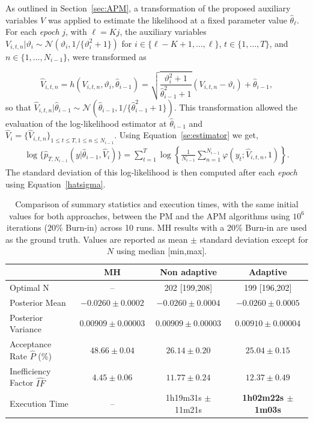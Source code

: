 \documentclass[pdflatex,sn-mathphys-num]{sn-jnl}
\renewcommand{\leq}{\leqslant}
\theoremstyle{thmstyleone}
\theoremstyle{thmstyletwo}
\theoremstyle{thmstylethree}
\begin{document}
As outlined in Section~\ref{sec:APM}, a transformation of the proposed auxiliary variables \( V \) was applied to estimate the likelihood at a fixed parameter value \( \hat{\theta}_\ell \). For each \textit{epoch} \( j \), with \( \ell = Kj \), the auxiliary variables \( V_{i,t,n}|\vartheta_i \sim \mathcal{N}(\vartheta_i, 1/\{\vartheta_i^2 + 1\}) \) for \( i \in \{\ell - K + 1, \ldots, \ell\} \), \( t \in \{1, \ldots, T\} \), and \( n \in \{1, \ldots, N_{i-1}\} \), were transformed as

\[
\widehat{V}_{i,t,n} = h(V_{i,t,n},\vartheta_i,\hat{\theta}_{i-1}) = \sqrt{\frac{\vartheta_i^2 + 1}{\hat{\theta}_{i-1}^2 + 1}}(V_{i,t,n} - \vartheta_i) + \hat{\theta}_{i-1},
\]
so that \( \widehat{V}_{i,t,n}|\hat{\theta}_{i-1} \sim \mathcal{N}(\hat{\theta}_{i-1}, 1/\{\hat{\theta}_{i-1}^2 + 1\}) \). This transformation allowed the evaluation of the log-likelihood estimator at $\hat\theta_{i-1}$ and $\widehat{V}_i=\{\widehat{V}_{i,t,n}\}_{1 \leq t\leq T, 1 \leq n\leq N_{i-1}}$. Using Equation~\eqref{se:estimator} we get,
\begin{align*}
   \log\{ \widehat{p}_{T, N_{i-1}}(y |\hat{\theta}_{i-1}, \widehat{V}_i) \} = \sum_{t=1}^{T} \log \left\{\frac{1}{N_{i-1}} \sum_{n=1}^{N_{i-1}} \varphi(y_t ; \widehat{V}_{i,t,n}, 1) \right\}.
\end{align*}
 The standard deviation of this log-likelihood is then computed after each \textit{epoch} using Equation~\eqref{hatsigma}.

\begin{table}[h]
\caption{Comparison of summary statistics and execution times, with the same initial values for both approaches, between the PM and the APM algorithms using $10^6$ iterations ($20\%$ Burn-in) across 10 runs. MH results with a 20\% Burn-in are used as the ground truth. Values are reported as mean $\pm$ standard deviation except for $N$ using median [min,max].}
\centering
\begin{tabular}{lccc}
\hline
 & MH & Non adaptive & Adaptive \\
\hline
Optimal N & – & 202 [199,208] & 199 [196,202] \\
Posterior Mean & $-0.0260 \pm 0.0002$ & $-0.0260 \pm 0.0004$ & $-0.0260 \pm 0.0005$ \\
Posterior Variance & $0.00909 \pm 0.00003$ & $0.00909 \pm 0.00003$ & $0.00910 \pm 0.00004$ \\
Acceptance Rate $\widehat{P}$ (\%) & $48.66 \pm 0.04$ & $26.14 \pm 0.20$ & $25.04 \pm 0.15$ \\
Inefficiency Factor $\widehat{IF}$ & $4.45 \pm 0.06$ & $11.77 \pm 0.24$ & $12.37 \pm 0.49$ \\
Execution Time & – & 1h19m31s $\pm$ 11m21s & \textbf{1h02m22s $\pm$ 1m03s} \\
\hline
\end{tabular}
\label{se:tab3}
\end{table}
\end{document}
